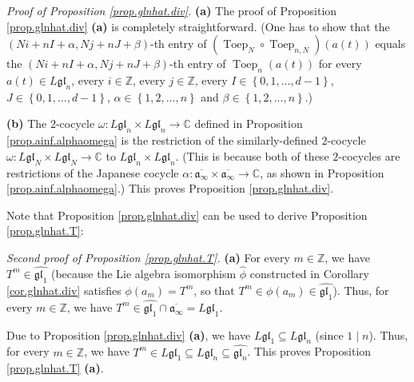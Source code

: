 \documentclass[etingof-lie.tex]{subfiles}
\begin{document}
\textit{Proof of Proposition \ref{prop.glnhat.div}.} \textbf{(a)} The proof of
Proposition \ref{prop.glnhat.div} \textbf{(a)} is completely straightforward.
(One has to show that the $\left(  Ni+nI+\alpha,Nj+nJ+\beta\right)  $-th entry
of $\left(  \operatorname*{Toep}\nolimits_{N}\circ\operatorname*{Toep}%
\nolimits_{n,N}\right)  \left(  a\left(  t\right)  \right)  $ equals the
$\left(  Ni+nI+\alpha,Nj+nJ+\beta\right)  $-th entry of $\operatorname*{Toep}%
\nolimits_{n}\left(  a\left(  t\right)  \right)  $ for every $a\left(
t\right)  \in L\mathfrak{gl}_{n}$, every $i\in\mathbb{Z}$, every
$j\in\mathbb{Z}$, every $I\in\left\{  0,1,...,d-1\right\}  $, $J\in\left\{
0,1,...,d-1\right\}  $, $\alpha\in\left\{  1,2,...,n\right\}  $ and $\beta
\in\left\{  1,2,...,n\right\}  $.)

\textbf{(b)} The $2$-cocycle $\omega:L\mathfrak{gl}_{n}\times L\mathfrak{gl}%
_{n}\rightarrow\mathbb{C}$ defined in Proposition \ref{prop.ainf.alphaomega}
is the restriction of the similarly-defined $2$-cocycle $\omega:L\mathfrak{gl}%
_{N}\times L\mathfrak{gl}_{N}\rightarrow\mathbb{C}$ to $L\mathfrak{gl}%
_{n}\times L\mathfrak{gl}_{n}$. (This is because both of these $2$-cocycles
are restrictions of the Japanese cocycle $\alpha:\overline{\mathfrak{a}%
_{\infty}}\times\overline{\mathfrak{a}_{\infty}}\rightarrow\mathbb{C}$, as
shown in Proposition \ref{prop.ainf.alphaomega}.) This proves Proposition
\ref{prop.glnhat.div}.

Note that Proposition \ref{prop.glnhat.div} can be used to derive Proposition
\ref{prop.glnhat.T}:

\textit{Second proof of Proposition \ref{prop.glnhat.T}.} \textbf{(a)} For
every $m\in\mathbb{Z}$, we have $T^{m}\in\widehat{\mathfrak{gl}_{1}}$ (because
the Lie algebra isomorphism $\widehat{\phi}$ constructed in Corollary
\ref{cor.glnhat.div} satisfies $\phi\left(  a_{m}\right)  =T^{m}$, so that
$T^{m}\in\phi\left(  a_{m}\right)  \in\widehat{\mathfrak{gl}_{1}}$). Thus, for
every $m\in\mathbb{Z}$, we have $T^{m}\in\widehat{\mathfrak{gl}_{1}}%
\cap\overline{\mathfrak{a}_{\infty}}=L\mathfrak{gl}_{1}$.

Due to Proposition \ref{prop.glnhat.div} \textbf{(a)}, we have $L\mathfrak{gl}%
_{1}\subseteq L\mathfrak{gl}_{n}$ (since $1\mid n$). Thus, for every
$m\in\mathbb{Z}$, we have $T^{m}\in L\mathfrak{gl}_{1}\subseteq L\mathfrak{gl}%
_{n}\subseteq\widehat{\mathfrak{gl}_{n}}$. This proves Proposition
\ref{prop.glnhat.T} \textbf{(a)}.
\end{document}
